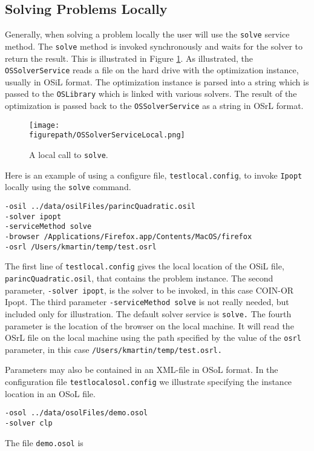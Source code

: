 \documentclass[11pt]{article}
\newcommand{\figurepath}{./figures}
\newcounter{Fig}
\renewcommand{\_}{{\char"5F}}
\renewcommand{\{}{{\char"7B}}
\renewcommand{\}}{{\char"7D}}
\renewcommand{\^}{{\char"0D}}
\renewcommand{\'}{{\char"0D}}
\begin{document}
\subsection{Solving Problems Locally}

Generally, when solving a problem locally the user will use the {\tt solve} service method. The {\tt solve} method is invoked synchronously and waits for the solver to return the result.  This is illustrated in Figure \ref{figure:ossolverservicelocal}. As illustrated, the {\tt OSSolverService} reads a file on the hard drive with the optimization instance, usually in OSiL format. The optimization instance is parsed into a string which is passed to the {\tt OSLibrary} which is linked with various solvers. The result of the optimization is passed back to the {\tt OSSolverService} as a string in OSrL format.



\begin{figure}
\centering
\texttt{[image: \\figurepath/OSSolverServiceLocal.png]}
\caption{A local call to {\tt solve}.}
\label{figure:ossolverservicelocal}
\end{figure}



Here is an example of using a configure file,  {\tt testlocal.config}, to invoke {\tt Ipopt} locally using the {\tt solve} command.

\begin{verbatim}
-osil ../data/osilFiles/parincQuadratic.osil
-solver ipopt
-serviceMethod solve
-browser /Applications/Firefox.app/Contents/MacOS/firefox
-osrl /Users/kmartin/temp/test.osrl
\end{verbatim}



The first line of {\tt testlocal.config} gives the local location of the OSiL file, {\tt parincQuadratic.osil}, that contains the problem instance. The second parameter, {\tt -solver ipopt},  is the solver to be invoked, in this case COIN-OR Ipopt. The third parameter {\tt -serviceMethod solve} is not really needed, but included only for illustration. The default  solver service is {\tt solve.}  The fourth parameter is the location of the browser on the local machine. It will read the OSrL file on the local machine using the path specified by the value of the {\tt osrl} parameter, in this case {\tt /Users/kmartin/temp/test.osrl.}

Parameters may also be contained in an XML-file in OSoL format. In the configuration file {\tt testlocalosol.config} we illustrate specifying the instance location in an OSoL file.
\begin{verbatim}
-osol ../data/osolFiles/demo.osol
-solver clp
\end{verbatim}
The file {\tt demo.osol} is
\end{document}
